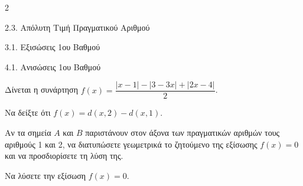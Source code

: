 \begin{ylh}{2}
    \item 2.3. Απόλυτη Τιμή Πραγματικού Αριθμού
    \item 3.1. Εξισώσεις 1ου Βαθμού
    \item 4.1. Ανισώσεις 1ου Βαθμού
\end{ylh}
Δίνεται η συνάρτηση $f(x) = \dfrac{|x - 1| - |3 - 3x| + |2x - 4|}{2}$.
\begin{alist}
\item Να δείξτε ότι $f(x) = d(x,2) - d(x,1)$.
\item Αν τα σημεία $A$ και $B$ παριστάνουν στον άξονα των πραγματικών αριθμών τους αριθμούς 1 και 2, να διατυπώσετε γεωμετρικά το ζητούμενο της εξίσωσης $f(x) = 0$ και να προσδιορίσετε τη λύση της.

\item Να λύσετε την εξίσωση $f(x) = 0$.
\end{alist}

